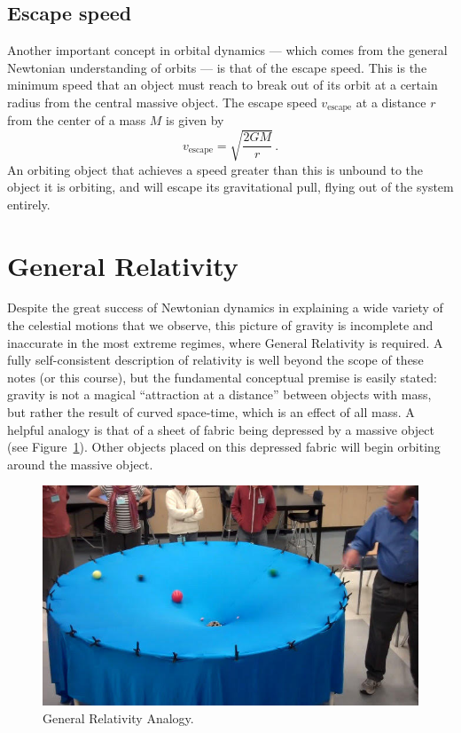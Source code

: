\subsection{Escape speed}

Another important concept in orbital dynamics --- which comes from the general Newtonian understanding of orbits --- is that of the escape speed. This is the minimum speed that an object must reach
to break out of its orbit at a certain radius from the central massive object. The escape speed $v_\textrm{escape}$ at a
distance $r$ from the center of a mass $M$ is given by
\begin{equation}\label{gc:eq:escape-speed}
 v_\textrm{escape} = \sqrt{\frac{2 G M}{r}} \,.
\end{equation}
An orbiting object that achieves a speed greater than this is unbound to the object it is orbiting, and will escape its gravitational pull, flying out of the system entirely.

\section{General Relativity}

Despite the great success of Newtonian dynamics in explaining a wide variety of the celestial motions
that we observe, this picture of gravity is incomplete and inaccurate in the most extreme regimes,
where General Relativity is required. A fully self-consistent description of relativity is well beyond the
scope of these notes (or this course), but the fundamental conceptual premise is easily stated: gravity
is not a magical “attraction at a distance” between objects with mass, but rather the result of curved
space-time, which is an effect of all mass. A helpful analogy is that of a sheet of fabric being depressed
by a massive object (see Figure~\ref{gc:fig:gen-rel-sheet}). Other objects placed on this depressed fabric will begin orbiting
around the massive object.

\begin{figure}
	\centering
	\includegraphics[width=\textwidth]{galactic-center/gen-rel-sheet.png}
	\caption{General Relativity Analogy.}\label{gc:fig:gen-rel-sheet}
\end{figure}


